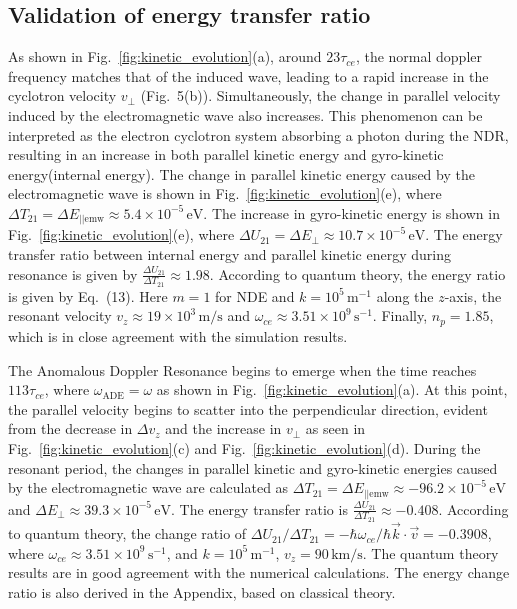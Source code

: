 \documentclass{cpbtex3}
\begin{document}
\subsection{Validation of energy transfer ratio  }

As shown in Fig.~\ref{fig:kinetic_evolution}(a), around \( 23\tau_{ce} \), the normal doppler frequency matches that of the induced wave, leading to a rapid increase in the cyclotron velocity \( v_{\perp} \) (Fig.~5(b)). Simultaneously, the change in parallel velocity induced by the electromagnetic wave also increases. This phenomenon can be interpreted as the electron cyclotron system absorbing a photon during the NDR, resulting in an increase in both parallel kinetic energy and gyro-kinetic energy(internal energy). The change in parallel kinetic energy caused by the electromagnetic wave is shown in Fig.~\ref{fig:kinetic_evolution}(e), where \( \Delta T_{21} = \Delta E_{||\text{emw}} \approx 5.4 \times 10^{-5} \, \text{eV} \). The increase in gyro-kinetic energy is shown in Fig.~\ref{fig:kinetic_evolution}(e), where \( \Delta U_{21} = \Delta E_{\perp} \approx 10.7 \times 10^{-5} \, \text{eV} \). The energy transfer ratio between internal energy and parallel kinetic energy during resonance is given by \( \frac{\Delta U_{21}}{\Delta T_{21}} \approx 1.98 \). According to quantum theory, the energy ratio is given by Eq.~(13). Here \( m = 1 \) for NDE and \( k = 10^5 \, \text{m}^{-1} \) along the \( z \)-axis, the resonant velocity \( v_z \approx 19 \times 10^3 \, \text{m/s} \) and \( \omega_{ce} \approx 3.51 \times 10^9 \, \text{s}^{-1} \). Finally, \( n_p = 1.85 \), which is in close agreement with the simulation results.

The Anomalous Doppler Resonance begins to emerge when the time reaches \( 113 \tau_{ce} \), where \( \omega_{\text{ADE}} = \omega \) as shown in Fig.~\ref{fig:kinetic_evolution}(a). At this point, the parallel velocity begins to scatter into the perpendicular direction, evident from the decrease in \( \Delta v_z \) and the increase in \( v_{\perp} \) as seen in Fig.~\ref{fig:kinetic_evolution}(c) and Fig.~\ref{fig:kinetic_evolution}(d). During the resonant period, the changes in parallel kinetic and gyro-kinetic energies caused by the electromagnetic wave are calculated as \( \Delta T_{21} = \Delta E_{||\text{emw}} \approx -96.2 \times 10^{-5} \, \text{eV} \) and \( \Delta E_{\perp} \approx 39.3 \times 10^{-5} \, \text{eV} \). The energy transfer ratio is \( \frac{\Delta U_{21}}{\Delta T_{21}} \approx -0.408 \). According to quantum theory, the change ratio of \( \Delta U_{21}/\Delta T_{21} = -\hbar \omega_{ce}/\hbar \vec{k} \cdot \vec{v} = -0.3908 \), where \( \omega_{ce} \approx 3.51 \times 10^9 \, \text{s}^{-1} \), and \( k = 10^5 \, \text{m}^{-1} \), \( v_z = 90 \, \text{km/s} \). The quantum theory results are in good agreement with the numerical calculations. The energy change ratio is also derived in the Appendix, based on classical theory.
\end{document}
